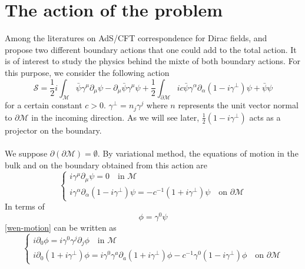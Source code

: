 \section{The action of the problem}
Among the literatures on AdS/CFT correspondence for Dirac fields,
\cite{Henningson1998} and~\cite{Contino2005} propose two different boundary actions that one could add to the total action.
It is of interest to study the physics behind the mixte of both boundary actions. 
For this purpose,
we consider the following action
\begin{equation}\label{wen-action}
\mathcal{S} = \frac{1}{2}i\int_{\mathcal{M}} \bar{\psi} \gamma^\mu \partial_\mu \psi - \partial_\mu \bar{\psi} \gamma^\mu \psi 
+ \frac{1}{2}\int_{\partial \mathcal{M}} ic \bar{\psi} \gamma^\alpha \partial_\alpha (1 - i \gamma^\bot) \psi
+ \bar{\psi} \psi
\end{equation}
for a certain constant $c >0$. 
$\gamma^\bot = n_j\gamma^j$ where $n$ represents the unit vector normal to $\partial \mathcal{M}$ in the incoming direction. 
As we will see later, $\frac 1 2 (1-i\gamma^\bot)$ acts as a projector on the boundary.
\\\\
We suppose $\partial(\partial \mathcal{M}) = \emptyset$.
By variational method, the equations of motion in the bulk and on the boundary obtained from this action are
\begin{equation}\label{wen-motion}
\begin{cases}
i \gamma^\mu \partial_\mu \psi = 0  \quad \textrm{in $\mathcal{M}$}\\
i \gamma^\alpha \partial_\alpha (1 - i\gamma^\bot) \psi = - c^{-1}(1 + i\gamma^{\bot}) \psi \quad \textrm{on $\partial \mathcal{M}$}
\end{cases}
\end{equation}
In terms of 
\begin{equation*}
\phi = \gamma^0 \psi
\end{equation*}
\cref{wen-motion} can be written as 
\begin{equation}\label{wen-maineq}
\begin{cases}
i \partial_0 \phi = i \gamma^0 \gamma^j \partial_j \phi   \quad \textrm{in $\mathcal{M}$}\\
i \partial_0(1 + i\gamma^\bot) \phi = i\gamma^0 \gamma^a \partial_a (1+ i\gamma^\bot)\phi - c^{-1} \gamma^0(1 - i \gamma^{\bot})\phi \quad \textrm{on $\partial \mathcal{M}$}
\end{cases}
\end{equation}
